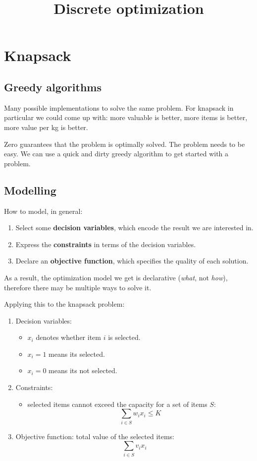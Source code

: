 \documentclass[]{article}
\title{Discrete optimization}
\author{}
\begin{document}
\tableofcontents

\maketitle
\section{Knapsack}
\subsection{Greedy algorithms}
Many possible implementations to solve the same problem. For knapsack in
particular we could come up with: more valuable is better, more items is better, more value per kg is
better.

Zero guarantees that the problem is optimally solved. The problem needs to be
easy. We can use a quick and dirty greedy algorithm to get started with a
problem.

\subsection{Modelling}

How to model, in general:
\begin{enumerate}
  \item Select some \textbf{decision variables}, which encode the result we are interested
        in.
  \item Express the \textbf{constraints} in terms of the decision variables.
  \item Declare an \textbf{objective function}, which specifies the quality of each solution.
\end{enumerate}

As a result, the optimization model we get is declarative (\textit{what}, not \textit{how}), therefore there may be multiple ways to solve it.

Applying this to the knapsack problem:

\begin{enumerate}
  \item{Decision variables}:
  \begin{itemize}
    \item $x_i$ denotes whether item $i$ is selected.
    \item $x_i=1$ means its selected.
    \item $x_i=0$ means its not selected.
  \end{itemize}
  \item{Constraints}:
  \begin{itemize}
    \item selected items cannot exceed the capacity for a set of items $S$:
          $$
            \sum_{i \in S}w_i x_i \leq K
          $$
  \end{itemize}
  \item{Objective function}: total value of the selected items:
  $$
    \sum_{i \in S}v_i x_i
  $$
\end{enumerate}
\end{document}
